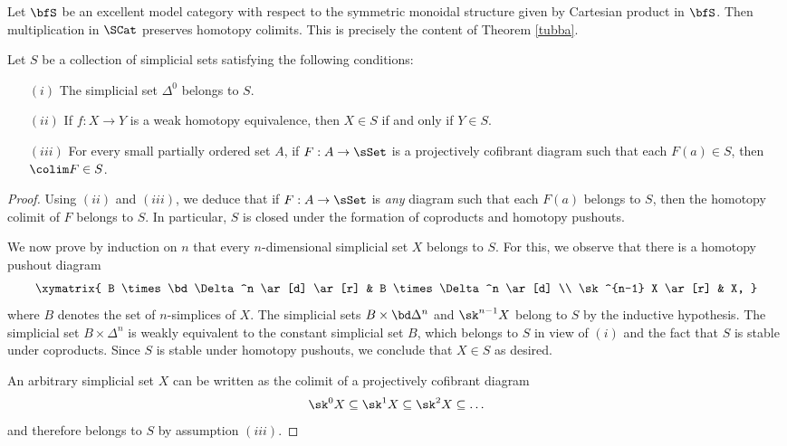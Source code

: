 \begin{example}\label{canuss}
Let $\bfS$ be an excellent model category with respect to the symmetric monoidal structure
given by Cartesian product in $\bfS$. Then multiplication in $\SCat$ preserves homotopy colimits.
This is precisely the content of Theorem \ref{tubba}.
\end{example}

\begin{lemma}\label{alem}
Let $S$ be a collection of simplicial sets satisfying the following conditions:
\begin{itemize}
\item[$(i)$] The simplicial set $\Delta^0$ belongs to $S$.
\item[$(ii)$] If $f: X \rightarrow Y$ is a weak homotopy equivalence, then
$X \in S$ if and only if $Y \in S$.
\item[$(iii)$] For every small partially ordered set $A$, if
$F: A \rightarrow \sSet$ is a projectively cofibrant diagram such that
each $F(a) \in S$, then $\colim F \in S$.
\end{itemize}
\end{lemma}

\begin{proof}
Using $(ii)$ and $(iii)$, we deduce that if $F: A \rightarrow \sSet$ is
{\em any} diagram such that each $F(a)$ belongs to $S$, then
the homotopy colimit of $F$ belongs to $S$. In particular, $S$ is closed under the formation of coproducts and homotopy pushouts.

We now prove by induction on $n$ that every $n$-dimensional simplicial set $X$ belongs to $S$.
For this, we observe that there is a homotopy pushout diagram
$$ \xymatrix{ B \times \bd \Delta^n \ar[d] \ar[r] & B \times \Delta^n \ar[d] \\
\sk^{n-1} X \ar[r] & X, }$$
where $B$ denotes the set of $n$-simplices of $X$. The simplicial sets
$B \times \bd \Delta^n$ and $\sk^{n-1} X$ belong to $S$ by the inductive hypothesis.
The simplicial set $B \times \Delta^n$ is weakly equivalent to the constant simplicial
set $B$, which belongs to $S$ in view of $(i)$ and the fact that $S$ is stable under coproducts.
Since $S$ is stable under homotopy pushouts, we conclude that $X \in S$ as desired.

An arbitrary simplicial set $X$ can be written as the colimit of a projectively cofibrant diagram
$$ \sk^{0} X \subseteq \sk^{1} X \subseteq \sk^{2} X \subseteq \ldots$$
and therefore belongs to $S$ by assumption $(iii)$.
\end{proof}

